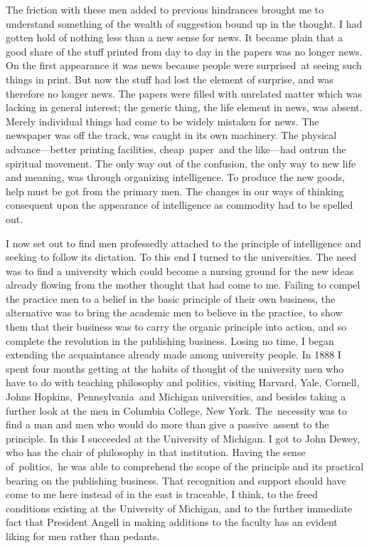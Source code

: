 \documentclass[openany,nobib]{tufte-book}
\begin{document}
The friction with these men added to previous hindrances brought me to
understand something of the wealth of suggestion bound up in the
thought. I had gotten hold of nothing less than a new sense for news. It
became plain that a good share of the stuff printed from day to day in
the papers was no longer news. On the first appearance it was news
because people were surprised~at seeing such things in print. But now
the stuff had lost the element of surprise, and was therefore no longer
news. The papers were filled with unrelated matter which was lacking in
general interest; the generic thing, the life element in news, was
absent. Merely individual things had come to be widely mistaken for
news. The newspaper was off the track, was caught in its own machinery.
The physical advance---better printing facilities, cheap~paper~and the
like---had outrun the spiritual movement. The only way out of the
confusion, the only way to new life and meaning, was through organizing
intelligence. To produce the new goods, help must be got from the
primary men. The changes in our ways of thinking consequent upon the
appearance of intelligence as commodity had to be spelled out.~

\enlargethispage{\baselineskip}

I now set out to find men professedly attached to the principle of
intelligence and seeking to follow its dictation. To this end I turned
to the universities. The need was to find a university which could
become a nursing ground for the new ideas already flowing from the
mother thought that had come to me. Failing to compel the practice men
to a belief in the basic principle of their own business, the
alternative was to bring the academic men to believe in the practice, to
show them that their business was to carry the organic principle into
action, and so complete the revolution in the publishing business.
Losing no time, I began extending the acquaintance already made among
university people. In 1888 I spent four months getting at the habits of
thought of the university men who have to do with teaching philosophy
and politics, visiting Harvard, Yale, Cornell, Johns
Hopkins,~Pennsylvania~and Michigan universities, and besides taking a
further look at the men in Columbia College, New York. The~necessity was
to find a man and men who would do more than give a passive~assent to
the principle. In this I succeeded at the University of Michigan. I got
to John Dewey, who has the chair of philosophy in that institution.
Having the sense of~politics,~he was able to comprehend the scope of the
principle and its practical bearing on the publishing business. That
recognition and support should have come to me here instead of in the
east is traceable, I think, to the freed conditions existing at the
University of Michigan, and to the further immediate fact that President
Angell in making additions to the faculty has an evident liking for men
rather than pedants.~
\end{document}
